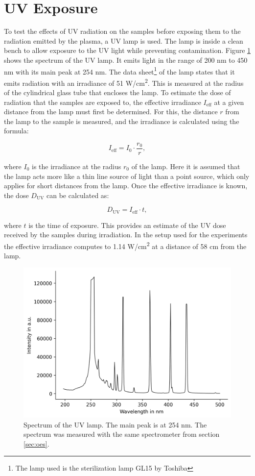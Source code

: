 \section{UV Exposure}
To test the effects of UV radiation on the samples before exposing them to the radiation emitted by the plasma, a UV lamp is used. The lamp is inside a clean bench to allow exposure to the UV light while preventing contamination. Figure \ref{fig:uv} shows the spectrum of the UV lamp. It emits light in the range of 200 nm to 450 nm with its main peak at 254 nm. The data sheet\footnote{The lamp used is the sterilization lamp \textsc{GL15} by Toshiba} of the lamp states that it emits radiation with an irradiance of 51 \textmu W/cm\textsuperscript{2}. This is measured at the radius of the cylindrical glass tube that encloses the lamp. To estimate the dose of radiation that the samples are exposed to, the effective irradiance $I_\text{eff}$ at a given distance from the lamp must first be determined. For this, the distance $r$ from the lamp to the sample is measured, and the irradiance is calculated using the formula:

\begin{equation}
I_\text{eff} = I_0 \cdot \frac{r_0}{r},
\end{equation}

where $I_0$ is the irradiance at the radius $r_0$ of the lamp. Here it is assumed that the lamp acts more like a thin line source of light than a point source, which only applies for short distances from the lamp. Once the effective irradiance is known, the dose $D_\text{UV}$ can be calculated as:

\begin{equation}
D_\text{UV} = I_\text{eff} \cdot t,
\label{eq:uv_dose}
\end{equation}

where $t$ is the time of exposure. This provides an estimate of the UV dose received by the samples during irradiation. In the setup used for the experiments the effective irradiance computes to 1.14 \textmu W/cm\textsuperscript{2} at a distance of 58 cm from the lamp.


\begin{figure}
    \centering
    \includegraphics[width=.8\textwidth]{images/UV_lamp_no_glass.png}
    \caption[Spectrum of UV lamp]{Spectrum of the UV lamp. The main peak is at 254 nm. The spectrum was measured with the same spectrometer from section \ref{sec:oes}.}
    \label{fig:uv}
\end{figure}

